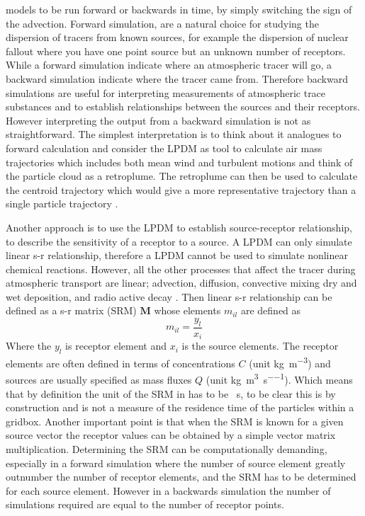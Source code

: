 models to be run forward or backwards in time, by simply switching the sign of the advection. Forward 
simulation, are a natural choice for studying the dispersion of tracers from known sources, for example the 
dispersion of nuclear fallout where you have one point source but an unknown number of receptors. While a 
forward simulation indicate where an atmospheric tracer will go, a backward simulation indicate where the 
tracer came from. Therefore backward simulations are useful for interpreting measurements of atmospheric 
trace substances and to establish relationships between the sources and their receptors.  However 
interpreting the output from a backward simulation is not as straightforward. The simplest interpretation is
to think about it analogues to forward calculation and consider the LPDM as tool to calculate air mass 
trajectories which includes both mean wind and turbulent motions and think of the particle cloud as a 
retroplume. The retroplume can then be used to calculate the centroid trajectory which would give a more 
representative trajectory than a single particle trajectory \parencite{stohl2002replacement}. \par Another 
approach is to use the LPDM to establish source-receptor relationship, to describe the sensitivity of a 
receptor to a source. A LPDM can only simulate linear s-r relationship, therefore a LPDM cannot be used to 
simulate nonlinear chemical reactions. However, all the other processes that affect the tracer during 
atmospheric transport are linear; advection, diffusion, convective mixing dry and wet deposition, and radio 
active decay \parencite{seibert2004source}. Then linear s-r relationship  can be defined as a s-r matrix 
(SRM) $\mathbf{M}$ whose elements $m_{il}$ are defined as
\begin{equation}\label{eq:s-r_relationship}
    m_{il} = \frac{y_l}{x_i}
\end{equation}
Where the $y_l$ is receptor element and $x_i$ is the source elements. The receptor elements are often 
defined in terms of concentrations $C$ (unit \si{\kg\per\cubic\metre}) and sources are usually specified as 
mass fluxes $Q$ (unit \si{\kg\per\cubic\metre\per\s}). 
Which means that by definition the unit of the SRM in  has to be \si{\per\s}, to be clear this is by construction and is not a measure of the residence time of the particles within a gridbox. Another important point is that when the SRM is known for a given source vector the receptor values can be obtained by a simple vector matrix multiplication. Determining the SRM can be computationally demanding, especially in a forward simulation where the number of source element greatly outnumber the number of receptor elements, and the SRM has to be determined for each source element. However in a backwards simulation the number of simulations required are equal to the number of receptor points. 
